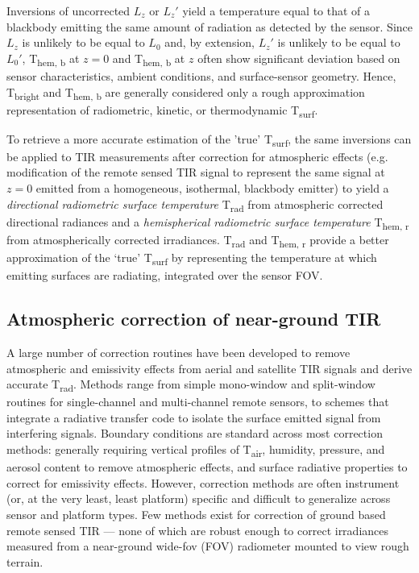 \begin{bibunit}
Inversions of uncorrected $ L_z $ or \textbf{$L_z'$} yield a temperature equal to that of a blackbody emitting the same amount of radiation as detected by the sensor. Since $ L_z $ is unlikely to be equal to $ L_0 $ and, by extension,  $L_z'$ is unlikely to be equal to $L_0'$, T\textsubscript{hem, b} at $ z = 0 $ and T\textsubscript{hem, b} at $ z $ often show significant deviation based on sensor characteristics, ambient conditions, and surface-sensor geometry. Hence, T\textsubscript{bright} and T\textsubscript{hem, b} are generally considered only a rough approximation representation of radiometric, kinetic, or thermodynamic T\textsubscript{surf}.

To retrieve a more accurate estimation of the 'true' T\textsubscript{surf}, the same inversions can be applied to TIR measurements after correction for atmospheric effects (e.g. modification of the remote sensed TIR signal to represent the same signal at $ z = 0 $ emitted from a homogeneous, isothermal, blackbody emitter) to yield a \textit{directional radiometric surface temperature} T\textsubscript{rad} from atmospheric corrected directional radiances and a \textit{hemispherical radiometric surface temperature} T\textsubscript{hem, r} from atmospherically corrected irradiances. T\textsubscript{rad} and T\textsubscript{hem, r} provide a better approximation of the ‘true’ T\textsubscript{surf} by representing the temperature at which emitting surfaces are radiating, integrated over the sensor FOV.


\subsection{Atmospheric correction of near-ground TIR} \label{Atmospheric correction of near-ground TIR}

A large number of correction routines have been developed to remove atmospheric and emissivity effects from aerial and satellite TIR signals and derive accurate T\textsubscript{rad}. Methods range from simple mono-window \citep{Qin2001} and split-window \citep{Wan1996} routines for single-channel and multi-channel remote sensors, to schemes that integrate a radiative transfer code to isolate the surface emitted signal from interfering signals. Boundary conditions are standard across most correction methods: generally requiring vertical profiles of T\textsubscript{air}, humidity, pressure, and aerosol content to remove atmospheric effects, and surface radiative properties to correct for emissivity effects. However, correction methods are often instrument (or, at the very least, least platform) specific and difficult to generalize across sensor and platform types. Few methods exist for correction of ground based remote sensed TIR --- none of which are robust enough to correct irradiances measured from a near-ground wide-\gls{fov} (FOV) radiometer mounted to view rough terrain. 


\end{bibunit}

